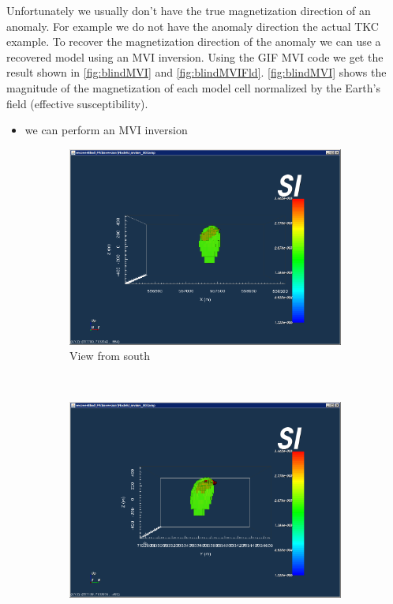 Unfortunately we usually don't have the true magnetization direction of an anomaly. For example we do not have the anomaly direction the actual TKC example. To recover the magnetization direction of the anomaly we can use a recovered model using an \ac{MVI} inversion. Using the \ac{GIF} \ac{MVI} code we get the result shown in \autoref{fig:blindMVI} and \autoref{fig:blindMVIFld}. \autoref{fig:blindMVI} shows the magnitude of the magnetization of each model cell normalized by the Earth's field (effective susceptibility). 



\begin{itemize}
  \item we can perform an \ac{MVI} inversion
\end{itemize}

\begin{figure}
    \centering
    \begin{subfigure}[b]{0.8\textwidth}
        \includegraphics[width=\textwidth]{images/TKC/blindMVIsouth.PNG}
        \caption{View from south}
        \label{fig:blindMVIsouth}
    \end{subfigure}
    ~ %
    \begin{subfigure}[b]{0.8\textwidth}
        \includegraphics[width=\textwidth]{images/TKC/blindMVIeast.PNG}

\end{subfigure}
\end{figure}
